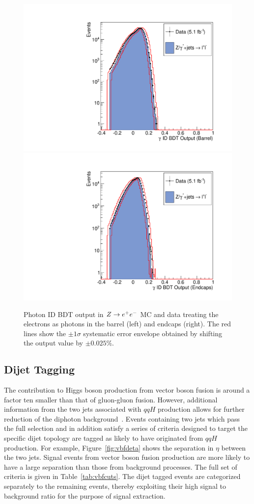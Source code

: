 \begin{figure}
  \includegraphics[width=.48\textwidth]{hgg7TeV/zeeValidation/phoID_EB.pdf}
  \includegraphics[width=.48\textwidth]{hgg7TeV/zeeValidation/phoID_EE.pdf}
\caption{Photon ID BDT output in $Z\rightarrow e^{+}e^{-}$ MC and data 
treating the electrons as photons in the barrel (left) and endcaps (right). 
The red lines show the $\pm 1\sigma$ systematic error envelope obtained by shifting the output value by $\pm 0.025\%$.}
\label{fig:zeevalidphoidmva}
\end{figure}

\subsection{Dijet Tagging}
\label{sec:dijettagging}

The contribution to Higgs boson production from vector boson fusion is around a factor ten smaller than that
of gluon-gluon fusion. However, additional information from the two jets associated 
with $qqH$ production allows for further reduction of the diphoton background~\citep{HIG-11-033}.
Events containing two jets which pass the full selection and in addition
satisfy a series of criteria designed to target the specific dijet topology are 
tagged as likely to have originated from $qqH$ production. For example, Figure~\ref{fig:vbfdeta} shows the 
separation in $\eta$ between the two jets. Signal events from vector boson fusion production are
more likely to have a large separation than those from background processes. The full set of 
criteria is given in Table~\ref{tab:vbfcuts}.
The dijet tagged events are categorized separately to 
the remaining events, thereby exploiting their high signal to background ratio for the purpose of signal
extraction. 

